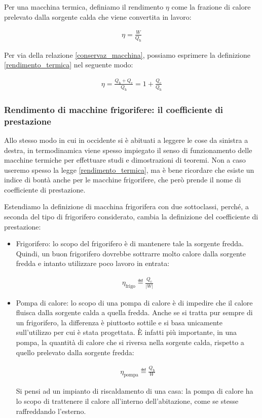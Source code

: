Per una macchina termica, definiamo il rendimento $\eta$ come
la frazione di calore prelevato dalla sorgente calda che
viene convertita in lavoro:

\begin{align}
    \eta = \frac{W}{Q_\text{h}}\label{rendimento_termica}
\end{align}

\noindent Per via della relazione \ref{conservaz_macchina},
possiamo esprimere la definizione \ref{rendimento_termica}
nel seguente modo:

\begin{align}
    \eta = \frac{Q_\text{h} + Q_\text{c}}{Q_\text{h}} = 1 + \frac{Q_\text{c}}{Q_\text{h}}
\end{align}


\subsubsection*{Rendimento di macchine frigorifere: il coefficiente di prestazione}
Allo stesso modo in cui in occidente si è abituati a leggere le cose
da sinistra a destra, in termodinamica viene spesso impiegato il senso di
funzionamento delle macchine termiche per effettuare studi e dimostrazioni
di teoremi. Non a caso useremo spesso la legge \ref{rendimento_termica},
ma è bene ricordare che esiste un indice di bontà anche per
le macchine frigorifere, che però prende il nome di coefficiente di
prestazione.

Estendiamo la definizione di macchina frigorifera con due sottoclassi, perché, a seconda del
tipo di frigorifero considerato, cambia la definizione del coefficiente
di prestazione:

\begin{itemize}
    \item Frigorifero: lo scopo del frigorifero è di mantenere tale la
    sorgente fredda. Quindi, un buon frigorifero dovrebbe sottrarre molto
    calore dalla sorgente fredda e intanto utilizzare poco lavoro in entrata:

    \begin{align}
        \eta_\text{frigo} \eqdef \frac{Q_\text{c}}{|W|}\label{rfrigo}
    \end{align}

    \item Pompa di calore: lo scopo di una pompa di calore è di impedire che
    il calore fluisca dalla sorgente calda a quella fredda. Anche se si tratta
    pur sempre di un frigorifero, la differenza è piuttosto sottile e si basa
    unicamente sull'utilizzo per cui è stata progettata. È infatti più importante,
    in una pompa, la quantità di calore che si riversa nella sorgente calda,
    rispetto a quello prelevato dalla sorgente fredda:

    \begin{align}
        \eta_\text{pompa} \eqdef \frac{Q_\text{h}}{W}\label{rpompa}
    \end{align}

    Si pensi ad un impianto di riscaldamento di una casa: la
    pompa di calore ha lo scopo di trattenere il calore all'interno
    dell'abitazione, come se stesse raffreddando l'esterno.
\end{itemize}


